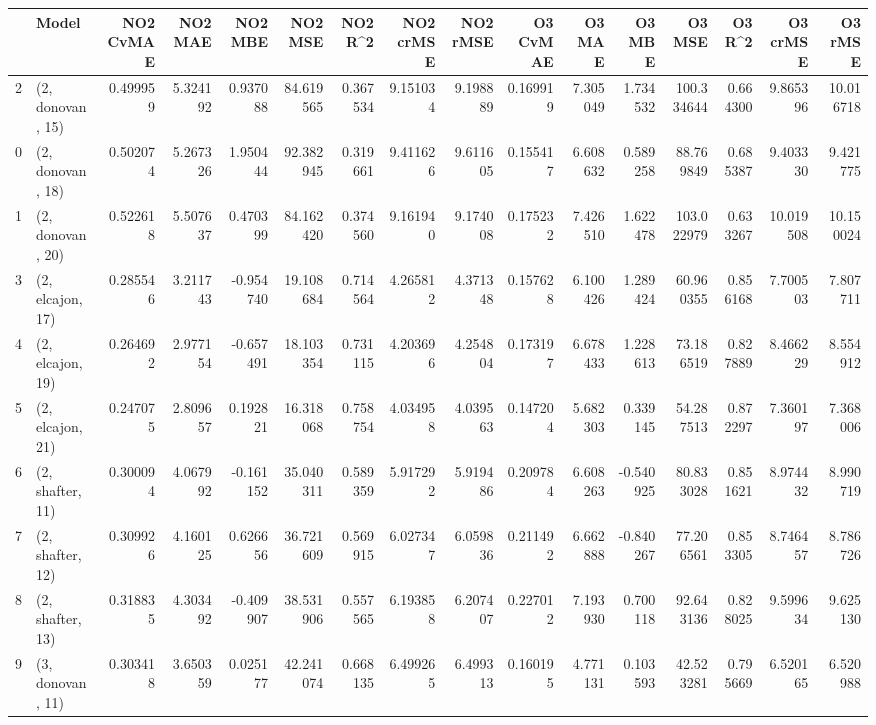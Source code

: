\begin{tabular}{llrrrrrrrrrrrrrr}
\toprule
{} &             Model &  NO2 CvMAE &   NO2 MAE &   NO2 MBE &    NO2 MSE &   NO2 R\textasciicircum2 &  NO2 crMSE &  NO2 rMSE &  O3 CvMAE &     O3 MAE &    O3 MBE &      O3 MSE &    O3 R\textasciicircum2 &   O3 crMSE &    O3 rMSE \\
\midrule
2  &  (2, donovan, 15) &   0.499959 &  5.324192 &  0.937088 &  84.619565 &  0.367534 &   9.151034 &  9.198889 &  0.169919 &   7.305049 &  1.734532 &  100.334644 &  0.664300 &   9.865396 &  10.016718 \\
0  &  (2, donovan, 18) &   0.502074 &  5.267326 &  1.950444 &  92.382945 &  0.319661 &   9.411626 &  9.611605 &  0.155417 &   6.608632 &  0.589258 &   88.769849 &  0.685387 &   9.403330 &   9.421775 \\
1  &  (2, donovan, 20) &   0.522618 &  5.507637 &  0.470399 &  84.162420 &  0.374560 &   9.161940 &  9.174008 &  0.175232 &   7.426510 &  1.622478 &  103.022979 &  0.633267 &  10.019508 &  10.150024 \\
3  &  (2, elcajon, 17) &   0.285546 &  3.211743 & -0.954740 &  19.108684 &  0.714564 &   4.265812 &  4.371348 &  0.157628 &   6.100426 &  1.289424 &   60.960355 &  0.856168 &   7.700503 &   7.807711 \\
4  &  (2, elcajon, 19) &   0.264692 &  2.977154 & -0.657491 &  18.103354 &  0.731115 &   4.203696 &  4.254804 &  0.173197 &   6.678433 &  1.228613 &   73.186519 &  0.827889 &   8.466229 &   8.554912 \\
5  &  (2, elcajon, 21) &   0.247075 &  2.809657 &  0.192821 &  16.318068 &  0.758754 &   4.034958 &  4.039563 &  0.147204 &   5.682303 &  0.339145 &   54.287513 &  0.872297 &   7.360197 &   7.368006 \\
6  &  (2, shafter, 11) &   0.300094 &  4.067992 & -0.161152 &  35.040311 &  0.589359 &   5.917292 &  5.919486 &  0.209784 &   6.608263 & -0.540925 &   80.833028 &  0.851621 &   8.974432 &   8.990719 \\
7  &  (2, shafter, 12) &   0.309926 &  4.160125 &  0.626656 &  36.721609 &  0.569915 &   6.027347 &  6.059836 &  0.211492 &   6.662888 & -0.840267 &   77.206561 &  0.853305 &   8.746457 &   8.786726 \\
8  &  (2, shafter, 13) &   0.318835 &  4.303492 & -0.409907 &  38.531906 &  0.557565 &   6.193858 &  6.207407 &  0.227012 &   7.193930 &  0.700118 &   92.643136 &  0.828025 &   9.599634 &   9.625130 \\
9  &  (3, donovan, 11) &   0.303418 &  3.650359 &  0.025177 &  42.241074 &  0.668135 &   6.499265 &  6.499313 &  0.160195 &   4.771131 &  0.103593 &   42.523281 &  0.795669 &   6.520165 &   6.520988 \\

\end{tabular}
